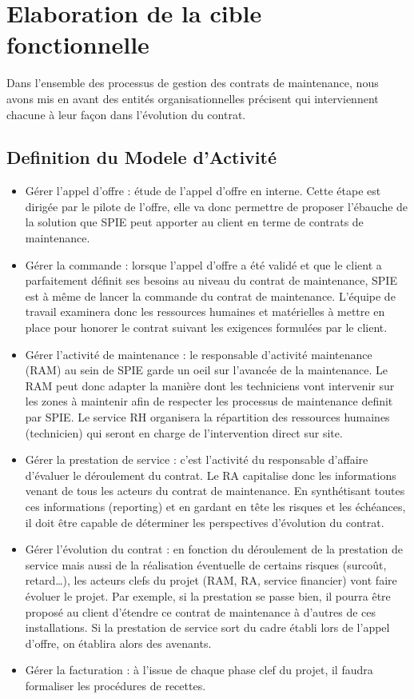 \section{Elaboration de la cible fonctionnelle}
Dans l'ensemble des processus de gestion des contrats de maintenance, nous avons mis en avant des entités organisationnelles précisent qui interviennent chacune à leur façon dans l'évolution du contrat.

\subsection{Definition du Modele d'Activité} 

\begin{itemize}
\item Gérer l'appel d'offre : étude de l'appel d'offre en interne. Cette étape est dirigée par le pilote de l'offre, elle va donc permettre de proposer l'ébauche de la solution que SPIE peut apporter au client en terme de contrats de maintenance.
\item Gérer la commande : lorsque l'appel d'offre a été validé et que le client a parfaitement définit ses besoins au niveau du contrat de maintenance, SPIE est à même de lancer la \og commande \fg du contrat de maintenance. L'équipe de travail examinera donc les ressources humaines et matérielles à mettre en place pour honorer le contrat suivant les exigences formulées par le client.
\item Gérer l'activité de maintenance : le responsable d'activité maintenance (RAM) au sein de SPIE garde un oeil sur l'avancée de la maintenance. Le RAM peut donc adapter la manière dont les techniciens vont intervenir sur les zones à maintenir afin de respecter les processus de maintenance definit par SPIE. Le service RH organisera la répartition des ressources humaines (technicien) qui seront en charge de l'intervention direct sur site.
\item Gérer la prestation de service : c'est l'activité du responsable d'affaire d'évaluer le déroulement du contrat. Le RA capitalise donc les informations venant de tous les acteurs du contrat de maintenance. En synthétisant toutes ces informations (reporting) et en gardant en tête les risques et les échéances, il doit être capable de déterminer les perspectives d'évolution du contrat.
\item Gérer l'évolution du contrat : en fonction du déroulement de la prestation de service mais aussi de la réalisation éventuelle de certains risques (surcoût, retard…), les acteurs clefs du projet (RAM, RA, service financier) vont faire évoluer le projet. Par exemple, si la prestation se passe bien, il pourra être proposé au client d'étendre ce contrat de maintenance à d'autres de ces installations. Si la prestation de service sort du cadre établi lors de l'appel d'offre, on établira alors des avenants.
\item Gérer la facturation : à l'issue de chaque phase clef du projet, il faudra formaliser les procédures de recettes. 
\end{itemize}

